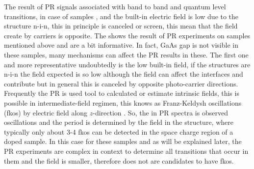 The result of PR signals associated with band to band and quantum level transitions, in case of samples ,  and  the built-in electric field is low due to the structure n-i-n, this in principle is canceled or screen, this mean that  the field create by carriers is opposite. The  shows the result of PR experiments on samples mentioned above and are a bit informative. In fact, GaAs gap is not visible in these samples, many mechanisms can affect the PR results in these. The first one and more representative  undoubtedly is the low built-in field, if the structures are n-i-n the field expected is so low although the field can affect the interfaces and contribute but in general this is canceled by opposite photo-carrier directions. Frequently the PR is used tool to calculated or estimate intrinsic fields, this is possible in intermediate-field regimen, this knows as Franz-Keldysh oscillations  (\gls{fkos}) by electric field along $z$-direction \cite{shen1995franz}. So, the in PR spectra is observed oscillations and the period is determined by the field in the structure, where typically only about 3-4 \gls{fkos} can be detected in the space charge region of a doped sample. In this case for these samples and as will be explained later, the PR experiments are complex in context to determine all transitions  that occur in them and the field is smaller, therefore does not are candidates to have \gls{fkos}.


